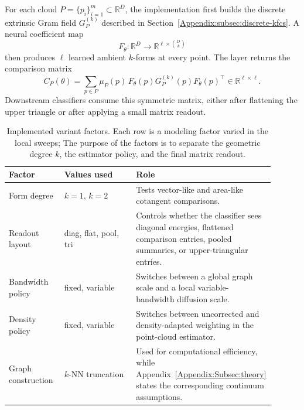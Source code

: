\documentclass{article}
\theoremstyle{remark}
\theoremstyle{plain}
\begin{document}
For each cloud \(P=\{p_i\}_{i=1}^{m}\subset\mathbb{R}^{D}\), the implementation first builds the discrete extrinsic Gram field \(G_P^{(k)}\) described in Section~\ref{Appendix:subsec:discrete-kfcs}. A neural coefficient map
\[
F_{\theta}:\mathbb{R}^{D}\to \mathbb{R}^{\ell\times {D \choose k}}
\]
then produces \(\ell\) learned ambient \(k\)-forms at every point. The layer returns the comparison matrix
\[
C_P(\theta) = \sum_{p\in P}\mu_P(p)\, F_{\theta}(p)G_P^{(k)}(p)F_{\theta}(p)^{\top} \in\mathbb{R}^{\ell\times \ell}.
\]
Downstream classifiers consume this symmetric matrix, either after flattening the upper triangle or after applying a small matrix readout.

\begin{table}[H]
\caption{Implemented variant factors. Each row is a modeling factor varied in the local sweeps; The purpose of the factors is to separate the geometric degree \(k\), the estimator policy, and the final matrix readout.}
\label{tab:implementation-variant-factors}
\centering
\small
\setlength{\tabcolsep}{4pt}
\renewcommand{\arraystretch}{1.12}
\begin{tabular}{p{0.21\linewidth}p{0.29\linewidth}p{0.40\linewidth}}
\toprule
Factor & Values used & Role \\
\midrule
Form degree & \(k=1\), \(k=2\) & Tests vector-like and area-like cotangent comparisons. \\
Readout layout & diag, flat, pool, tri & Controls whether the classifier sees diagonal energies, flattened comparison entries, pooled summaries, or upper-triangular entries. \\
Bandwidth policy & fixed, variable & Switches between a global graph scale and a local variable-bandwidth diffusion scale. \\
Density policy & fixed, variable & Switches between uncorrected and density-adapted weighting in the point-cloud estimator. \\
Graph construction & \(k\)-NN truncation & Used for computational efficiency, while Appendix~\ref{Appendix:Subsec:theory} states the corresponding continuum assumptions. \\
\bottomrule
\end{tabular}
\end{table}
\end{document}
